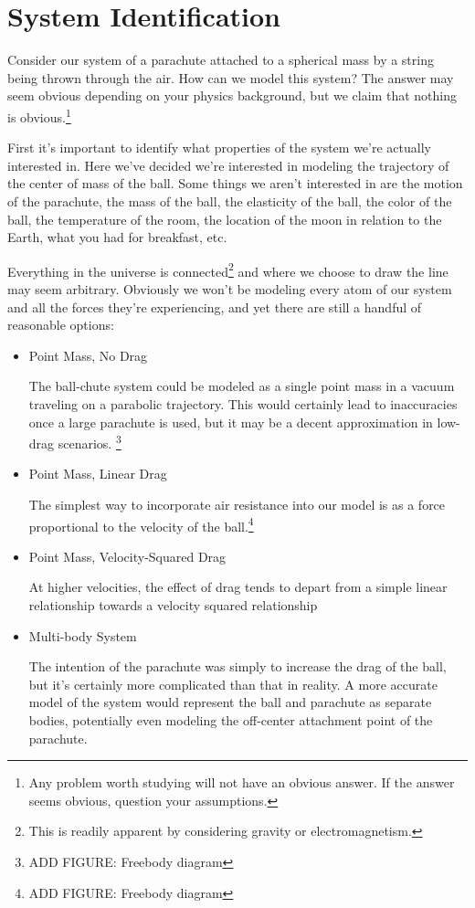 \section{System Identification}

Consider our system of a parachute attached to a spherical mass by a string being thrown through the air. How can we model this system? The answer may seem obvious depending on your physics background, but we claim that nothing is obvious.\footnote{Any problem worth studying will not have an obvious answer. If the answer seems obvious, question your assumptions.}

First it's important to identify what properties of the system we're actually interested in. Here we've decided we're interested in modeling the trajectory of the center of mass of the ball. Some things we aren't interested in are the motion of the parachute, the mass of the ball, the elasticity of the ball, the color of the ball, the temperature of the room, the location of the moon in relation to the Earth, what you had for breakfast, etc. 

Everything in the universe is connected\footnote{This is readily apparent by considering gravity or electromagnetism.} and where we choose to draw the line may seem arbitrary. Obviously we won't be modeling every atom of our system and all the forces they're experiencing, and yet there are still a handful of reasonable options:

\begin{itemize}
\item Point Mass, No Drag

The ball-chute system could be modeled as a single point mass in a vacuum traveling on a parabolic trajectory. This would certainly lead to inaccuracies once a large parachute is used, but it may be a decent approximation in low-drag scenarios. \footnote{ADD FIGURE: Freebody diagram}

\item Point Mass, Linear Drag 

The simplest way to incorporate air resistance into our model is as a force proportional to the velocity of the ball.\footnote{ADD FIGURE: Freebody diagram}

\item Point Mass, Velocity-Squared Drag

At higher velocities, the effect of drag tends to depart from a simple linear relationship towards a velocity squared relationship

\item Multi-body System

The intention of the parachute was simply to increase the drag of the ball, but it's certainly more complicated than that in reality. A more accurate model of the system would represent the ball and parachute as separate bodies, potentially even modeling the off-center attachment point of the parachute. 

\end{itemize}

